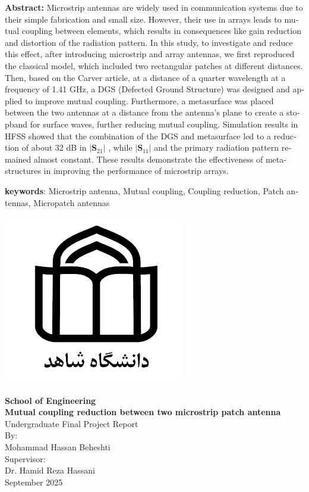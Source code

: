 \newpage
\thispagestyle{empty}
\begin{latin}
\textbf{Abstract:}
Microstrip antennas are widely used in communication systems due to their simple fabrication and small size. However, their use in arrays leads to mutual coupling between elements, which results in consequences like gain reduction and distortion of the radiation pattern. In this study, to investigate and reduce this effect, after introducing microstrip and array antennas, we first reproduced the classical model, which included two rectangular patches at different distances. Then, based on the Carver article, at a distance of a quarter wavelength at a frequency of 1.41 GHz, a DGS (Defected Ground Structure) was designed and applied to improve mutual coupling. Furthermore, a metasurface was placed between the two antennas at a distance from the antenna's plane to create a stopband for surface waves, further reducing mutual coupling. Simulation results in HFSS showed that the combination of the DGS and metasurface led to a reduction of about 32 dB in
$\vert\bm{S}_{21}\vert$
, while 
$\vert\bm{S}_{11}\vert$
and the primary radiation pattern remained almost constant. These results demonstrate the effectiveness of meta-structures in improving the performance of microstrip arrays.



\textbf{keywords}: 
Microstrip antenna, Mutual coupling, Coupling reduction, Patch antennas, Micropatch antennas
\end{latin}
\newpage
\newpage
\thispagestyle{empty}
\vspace*{-28mm}

\centerline{\includegraphics[scale=0.5]{./Images/general/logo_en.png}}
\begin{latin}
\begin{center}
\large
\vspace{-1mm}
\textbf{School of Engineering}
\\[3cm]
\textbf{Mutual coupling reduction between two microstrip patch antenna}
\\[1.5cm]
Undergraduate Final Project Report
\\[4cm]
By: 
\\[0.5cm]
Mohammad Hassan Beheshti
\\[1cm]
Supervisor:
\\[0.5cm]
Dr. Hamid Reza Hassani
\\[2cm]
September 2025

\end{center}
\end{latin}